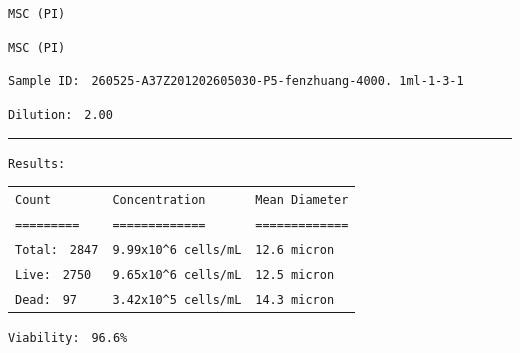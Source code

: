 \documentclass[UTF8,10pt,a4paper,fontset=fandol]{ctexart}
\newcommand{\fieldvalue}[1]{#1}
\begin{document}
\noindent\texttt{MSC (PI)}

\fieldvalue{\texttt{MSC (PI)}}

\noindent\texttt{Sample ID: }
\fieldvalue{\texttt{260525-A37Z201202605030-P5-fenzhuang-4000. 1ml-1-3-1}}

\noindent\texttt{Dilution: }
\fieldvalue{\texttt{2.00}}

\vspace{0.5em}
\hrule
\vspace{0.5em}

\noindent\texttt{Results:}

\vspace{0.4em}

\begin{tabularx}{\textwidth}{@{}lXl@{}}
\texttt{Count} & \texttt{Concentration} & \texttt{Mean Diameter} \\
\texttt{=========} & \texttt{=============} & \texttt{=============} \\

\texttt{Total: }
\fieldvalue{\texttt{2847}}
&
\fieldvalue{\texttt{9.99x10\textasciicircum{}6 cells/mL}}
&
\fieldvalue{\texttt{12.6 micron}}
\\

\texttt{Live: }
\fieldvalue{\texttt{2750}}
&
\fieldvalue{\texttt{9.65x10\textasciicircum{}6 cells/mL}}
&
\fieldvalue{\texttt{12.5 micron}}
\\

\texttt{Dead: }
\fieldvalue{\texttt{97}}
&
\fieldvalue{\texttt{3.42x10\textasciicircum{}5 cells/mL}}
&
\fieldvalue{\texttt{14.3 micron}}
\end{tabularx}

\vspace{0.5em}

\noindent\texttt{Viability: }
\fieldvalue{\texttt{96.6\%}}
\end{document}
